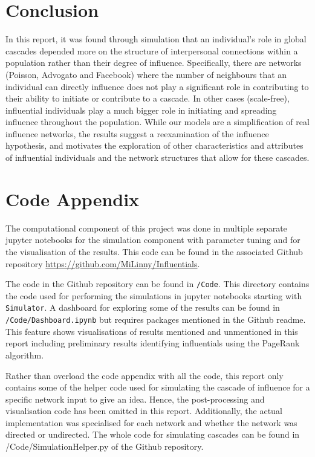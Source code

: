\documentclass[10pt, oneside, reqno]{amsart}
\theoremstyle{plain}%
\theoremstyle{definition}
\theoremstyle{remark}
\begin{document}
\section{Conclusion}

In this report, it was found through simulation that an individual's role in global cascades depended more on the structure of interpersonal connections within a population rather than their degree of influence.
Specifically, there are networks (Poisson, Advogato and Facebook) where the number of neighbours that an individual can directly influence does not play a significant role in contributing to their ability to initiate or contribute to a cascade.
In other cases (scale-free), influential individuals play a much bigger role in initiating and spreading influence throughout the population. 
While our models are a simplification of real influence networks, the results suggest a reexamination of the influence hypothesis, and motivates the exploration of other characteristics and attributes of influential individuals and the network structures that allow for these cascades.


\newpage



\section*{Code Appendix}

The computational component of this project was done in multiple separate jupyter notebooks for the simulation component with parameter tuning and for the visualisation of the results.
This code can be found in the associated Github repository \url{https://github.com/MiLinny/Influentials}.

The code in the Github repository can be found in \texttt{/Code}.
This directory contains the code used for performing the simulations in jupyter notebooks starting with \texttt{Simulator}.
A dashboard for exploring some of the results can be found in \texttt{/Code/Dashboard.ipynb} but requires packages mentioned in the Github readme. 
This feature shows visualisations of results mentioned and unmentioned in this report including preliminary results identifying influentials using the PageRank algorithm.

Rather than overload the code appendix with all the code, this report only contains some of the helper code used for simulating the cascade of influence for a specific network input to give an idea. 
Hence, the post-processing and visualisation code has been omitted in this report.
Additionally, the actual implementation was specialised for each network and whether the network was directed or undirected.
The whole code for simulating cascades can be found in /Code/SimulationHelper.py of the Github repository.
\end{document}
